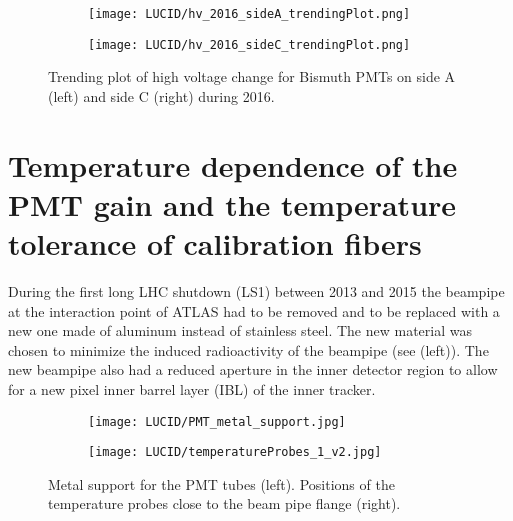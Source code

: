 \begin{figure}
\centering
\begin{subfigure}{.5\textwidth}
  \centering
  \texttt{[image: LUCID/hv\_2016\_sideA\_trendingPlot.png]}
  \label{fig:sub3}
\end{subfigure}%
\begin{subfigure}{.5\textwidth}
  \centering
  \texttt{[image: LUCID/hv\_2016\_sideC\_trendingPlot.png]}
  \label{fig:sub4}
\end{subfigure}
\caption{Trending plot of high voltage change for Bismuth PMTs on side A (left) and side C (right) during 2016.}
\label{fig:hv_trending_plot_2016}
\end{figure}




% 
% 

\section{Temperature dependence of the PMT gain and the temperature tolerance of calibration fibers}
\label{sec:tempMeas}

During the first long LHC shutdown (LS1) between 2013 and 2015 the beampipe at the interaction point of ATLAS
had to be removed and to be replaced with a new one made of aluminum instead of stainless steel.
The new material was chosen to minimize the induced radioactivity of the beampipe (see  (left)).
The new beampipe also had a reduced aperture in the inner detector region to allow for a new pixel inner barrel layer (IBL) of the inner tracker.

\begin{figure}
\centering
\begin{subfigure}{.6\textwidth}
  \centering
  \texttt{[image: LUCID/PMT\_metal\_support.jpg]}
\end{subfigure}%
\begin{subfigure}{.4\textwidth}
  \centering
  \texttt{[image: LUCID/temperatureProbes\_1\_v2.jpg]}
\end{subfigure}
\caption{Metal support for the PMT tubes (left). Positions of the temperature probes close to the beam pipe flange (right).}
\label{fig:metalSupportAndTempProbes}
\end{figure}

